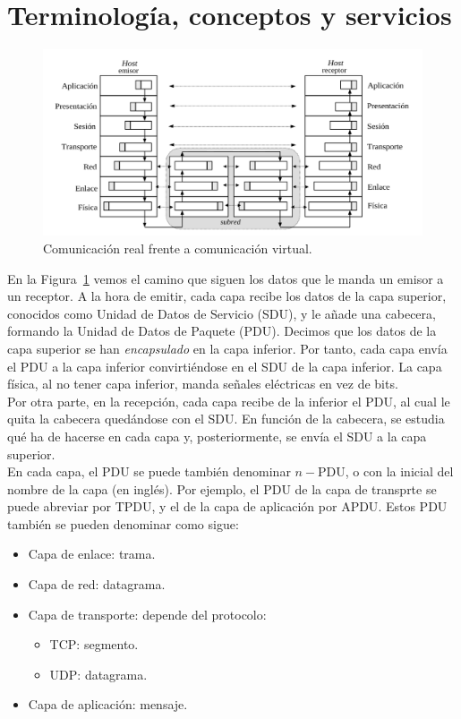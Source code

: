 \section{Terminología, conceptos y servicios} \label{sec:terminologia}

\begin{figure}
    \centering
    \includegraphics[width=0.8\linewidth]{./images/comunicacionHosts.png}
    \caption{Comunicación real frente a comunicación virtual.}
    \label{fig:comHosts}
\end{figure}

En la Figura~\ref{fig:comHosts} vemos el camino que siguen los datos que le manda un emisor a un receptor. A la hora de emitir, cada capa recibe los datos de la capa superior, conocidos como Unidad de Datos de Servicio (\acrfull{SDU}), y le añade una cabecera, formando la Unidad de Datos de Paquete (\acrfull{PDU}). Decimos que los datos de la capa superior se han \emph{encapsulado} en la capa inferior. Por tanto, cada capa envía el \acrshort{PDU} a la capa inferior convirtiéndose en el \acrshort{SDU} de la capa inferior. La capa física, al no tener capa inferior, manda señales eléctricas en vez de bits. \\

Por otra parte, en la recepción, cada capa recibe de la inferior el \acrshort{PDU}, al cual le quita la cabecera quedándose con el \acrshort{SDU}. En función de la cabecera, se estudia qué ha de hacerse en cada capa y, posteriormente, se envía el \acrshort{SDU} a la capa superior.\\

En cada capa, el \acrshort{PDU} se puede también denominar $n-$\acrshort{PDU}, o con la inicial del nombre de la capa (en inglés). Por ejemplo, el \acrshort{PDU} de la capa de transprte se puede abreviar por \acrshort{TPDU}, y el de la capa de aplicación por \acrshort{APDU}.
Estos \acrshort{PDU} también se pueden denominar como sigue:
\begin{itemize}
    \item Capa de enlace: trama.
    \item Capa de red: datagrama.
    \item Capa de transporte: depende del protocolo:
        \begin{itemize}
            \item \acrshort{TCP}: segmento.
            \item \acrshort{UDP}: datagrama.
        \end{itemize}
    \item Capa de aplicación: mensaje.
\end{itemize}

